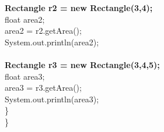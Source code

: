 \begin{flushleft}
\begin{itemize}
{			\s \s		\textbf{Rectangle r2 = new Rectangle(3,4);} \\
			\s \s		float area2; \\
			\s \s		area2 = r2.getArea(); \\
			\s \s		System.out.println(area2); \\
			\\
			\s \s		\textbf{Rectangle r3 = new Rectangle(3,4,5);} \\
			\s \s		float area3; \\
			\s \s		area3 = r3.getArea(); \\
			\s \s		System.out.println(area3); \\
			\s \} \\
			\}	
		}
	
		\bigskip
		
	\end{itemize}
	
\end{flushleft}
\newpage



